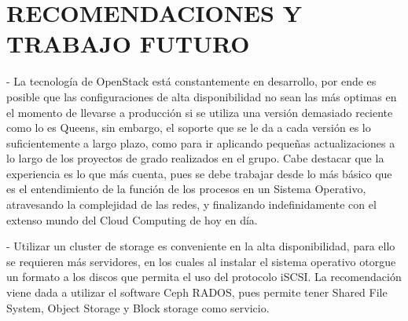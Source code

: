     
    
   
    
   
    
    
  
    
    
  
  
    
  
    
       
  
    
         
     
     
     
  
      
      	
      
     
      
      
      
      
    
  

    

    
    
    

    
    
    
   
        
   
   
   
 
    
    
    
     
    \newpage\chapter{RECOMENDACIONES Y TRABAJO FUTURO}
    
    - La tecnología de OpenStack está constantemente en desarrollo, por ende es posible que las configuraciones de alta disponibilidad no sean las más optimas en el momento de llevarse a producción si se utiliza una versión demasiado reciente como lo es Queens, sin embargo, el soporte que se le da a cada versión es lo suficientemente a largo plazo, como para ir aplicando pequeñas actualizaciones a lo largo de los proyectos de grado realizados en el grupo. Cabe destacar que la experiencia es lo que más cuenta, pues se debe trabajar desde lo más básico que es el entendimiento de la función de los procesos en un Sistema Operativo, atravesando la complejidad de las redes, y finalizando indefinidamente con el extenso mundo del Cloud Computing de hoy en día.
    
    - Utilizar un cluster de storage es conveniente en la alta disponibilidad, para ello se requieren más servidores, en los cuales al instalar el sistema operativo otorgue un formato a los discos que permita el uso del protocolo iSCSI. La recomendación viene dada a utilizar el software Ceph RADOS, pues permite tener Shared File System, Object Storage y Block storage como servicio.
    
